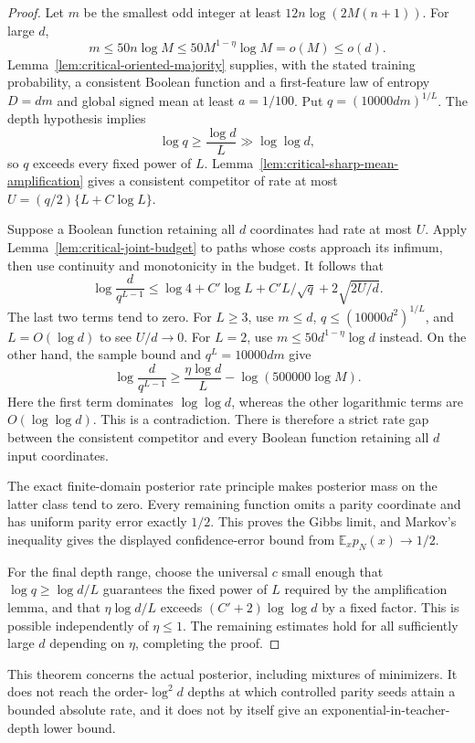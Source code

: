 \begin{proof}
Let $m$ be the smallest odd integer at least
$12n\log(2M(n+1))$. For large $d$,
\[
 m\le50n\log M\le50M^{1-\eta}\log M=o(M)\le o(d).
\]
Lemma~\ref{lem:critical-oriented-majority} supplies, with the stated
training probability, a consistent Boolean function and a first-feature
law of entropy $D=dm$ and global signed mean at least $a=1/100$.
Put $q=(10000dm)^{1/L}$. The depth hypothesis implies
\[
 \log q\ge\frac{\log d}{L}\gg\log\log d,
\]
so $q$ exceeds every fixed power of $L$.
Lemma~\ref{lem:critical-sharp-mean-amplification} gives a consistent
competitor of rate at most $U=(q/2)\{L+C\log L\}$.

Suppose a Boolean function retaining all $d$ coordinates had rate at
most $U$. Apply Lemma~\ref{lem:critical-joint-budget} to paths whose
costs approach its infimum, then use continuity and monotonicity in
the budget. It follows that
\[
 \log\frac d{q^{L-1}}
 \le\log4+C'\log L+C'L/\sqrt q+2\sqrt{2U/d}.
\]
The last two terms tend to zero. For $L\ge3$, use $m\le d$,
$q\le(10000d^2)^{1/L}$, and $L=O(\log d)$ to see $U/d\to0$.
For $L=2$, use $m\le50d^{1-\eta}\log d$ instead.
On the other hand, the sample bound and $q^L=10000dm$ give
\[
 \log\frac d{q^{L-1}}
 \ge\frac{\eta\log d}{L}-\log(500000\log M).
\]
Here the first term dominates $\log\log d$, whereas the other
logarithmic terms are $O(\log\log d)$. This is a contradiction.
There is therefore a strict rate gap between the consistent competitor
and every Boolean function retaining all $d$ input coordinates.

The exact finite-domain posterior rate principle makes posterior mass
on the latter class tend to zero. Every remaining function omits a
parity coordinate and has uniform parity error exactly $1/2$.
This proves the Gibbs limit, and Markov's inequality gives the displayed
confidence-error bound from $\mathbb E_xp_N(x)\to1/2$.

For the final depth range, choose the universal $c$ small enough that
$\log q\ge\log d/L$ guarantees the fixed power of $L$ required by
the amplification lemma, and that
$\eta\log d/L$ exceeds $(C'+2)\log\log d$ by a fixed factor.
This is possible independently of $\eta\le1$.
The remaining estimates hold for all sufficiently large $d$ depending
on $\eta$, completing the proof.
\end{proof}

This theorem concerns the actual posterior, including mixtures of
minimizers. It does not reach the order-$\log^2d$ depths at which
controlled parity seeds attain a bounded absolute rate, and it does
not by itself give an exponential-in-teacher-depth lower bound.
